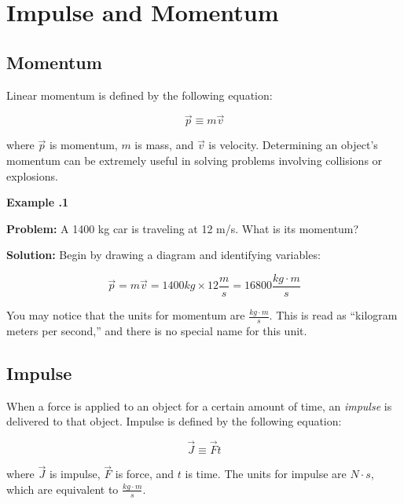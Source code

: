 \chapter{Impulse and Momentum}
	\section{Momentum} \label{momentum}  
	Linear momentum is defined by the following equation:
	\begin{mdframed}[backgroundcolor=orange!20!white]
		\begin{equation}
		\vec{p} \equiv m \vec{v} 
		\label{eqn:momentum}
		\end{equation}
	\end{mdframed}
	 where $\vec{p}$ is momentum, $m$ is mass, and $\vec{v} $ is velocity.  Determining an object's momentum can be extremely useful in solving problems involving collisions or explosions.  
	 
	 \begin{mdframed}[backgroundcolor=blue!10!white]
	 	\begin{center}
	 		
	 		
	 		\textbf{Example \thesection.1}	
	 	\end{center}
	 	
	 	\textbf{Problem: } A 1400 kg car is traveling at 12 m/s.  What is its momentum? 
	 	\vspace{0.1in}
	 	
	 	\textbf{Solution:} 
	 	Begin by drawing a diagram and identifying variables:
	 	
	 	
	 	\begin{equation*}
	 	\vec{p} = m \vec{v} = 1400 kg \times 12 \frac{m}{s} = 16800 \frac{kg\cdot m}{s}
	 	\end{equation*}
	 	
	 \end{mdframed}
	 \vspace{0.1in}
	 You may notice that the units for momentum are $\frac{kg \cdot m} {s}$.  This is read as ``kilogram meters per second,'' and there is no special name for this unit.  
	 
	 
	\section{Impulse} \label{impulse} 
		When a force is applied to an object for a certain amount of time, an \textit{impulse} is delivered to that object.  Impulse is defined by the following equation:
	\begin{mdframed}[backgroundcolor=orange!20!white]
		\begin{equation}
		\vec{J} \equiv \vec{F} t 
		\label{eqn:Impulse}
		\end{equation}
	\end{mdframed}
	where $\vec{J}$ is impulse, $\vec{F}$ is force, and $t $ is time.  The units for impulse are $\si{N\cdot s}$, which are equivalent to $ \si{\frac{kg \cdot m}{s}}$.
	
